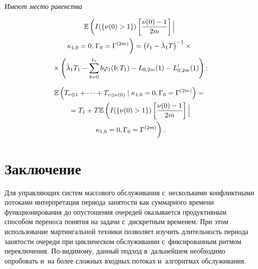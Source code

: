 \begin{multicols}{2}
  \vspace*{-4pt}
  
  \noindent
  \textit{Имеют место равенства}
  
\vspace*{-6pt}

\noindent
  \begin{multline*}
        \mathbb{E}  \left(  I(\{\nu(0) >1\})  \left[ \fr{\nu(0)-1}{2m} \right] 
\Big| \right.\\
\kappa_{1,0}=0,
\left. \Gamma_0=\Gamma^{(2m)} 
\vphantom{\left[ \fr{\nu(0)-1}{2m} \right]}
 \right ) =
        \left(\ell_1-\bar\lambda_1 T\right)^{-1} \times{}        \\ 
        {} \times
        \left(
        \bar\lambda_1 T_1 - \sum\limits_{b=0}^{\ell_1} b \varphi_1(b; T_1)
        -L_{0,2m}(1)-L_{0,2m}'(1)    \right);
  \end{multline*}
  
  \vspace*{-12pt}
  
  \noindent
  \begin{multline*}
    \mathbb {E}\left(  T_{r\oplus1} +\cdots+T_{r\oplus \nu(0)}\mid \kappa_{1,0}=0,
    \Gamma_0=\Gamma^{(2m)}\right)={}    \\ 
    {} =
    T_{1}+ T 
    \mathbb {E} \left(
    I(\{\nu(0)>1\}) \left[ \fr{\nu(0)-1}{2m} \right] \Big|\right.\\
 \left.     \kappa_{1,0}=0,    \Gamma_0=\Gamma^{(2m)}
 \vphantom{\left[ \fr{\nu(0)-1}{2m} \right]}
  \right) .
  \end{multline*}

\vspace*{-24pt}



\section{Заключение}

\vspace*{-3pt}

Для управляющих систем массового обслуживания с~несколькими конфликтными
потоками интерпретация периода занятости как суммарного времени функционирования
до опустошения очередей оказывается продуктивным способом переноса понятия на
задачи с~дискретным временем. При этом использование мартингальной техники
позволяет изучить длительность периода занятости очереди при циклическом
обслуживании с~фиксированным ритмом переключения. По-ви\-ди\-мо\-му, 
данный подход в~дальнейшем необходимо опробовать и~на более сложных входных потоках и~алгоритмах
обслуживания.


\end{multicols}
